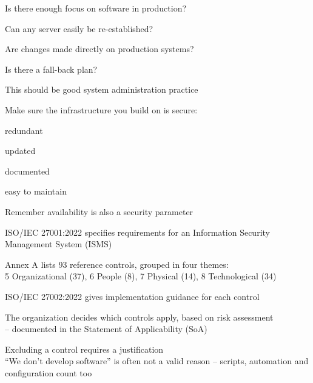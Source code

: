 \documentclass[Screen16to9,17pt]{foils}
\begin{document}

\begin{list1}
\item Is there enough focus on software in production?
\item Can any server easily be re-established?
\item Are changes made directly on production systems?
\item Is there a fall-back plan?
\item This should be good system administration practice
\end{list1}


\begin{list1}
\item Make sure the infrastructure you build on is secure:
\begin{list2}
\item redundant
\item updated
\item documented
\item easy to maintain
\end{list2}
\item Remember availability is also a security parameter
\end{list1}



\begin{list2}
\item ISO/IEC 27001:2022 specifies requirements for an Information Security Management System (ISMS)
\item Annex A lists 93 reference controls, grouped in four themes:\\
5 Organizational (37), 6 People (8), 7 Physical (14), 8 Technological (34)
\item ISO/IEC 27002:2022 gives implementation guidance for each control
\item The organization decides which controls apply, based on risk assessment\\
-- documented in the Statement of Applicability (SoA)
\item Excluding a control requires a justification\\
``We don't develop software'' is often not a valid reason -- scripts, automation and configuration count too
\end{list2}
\end{document}
